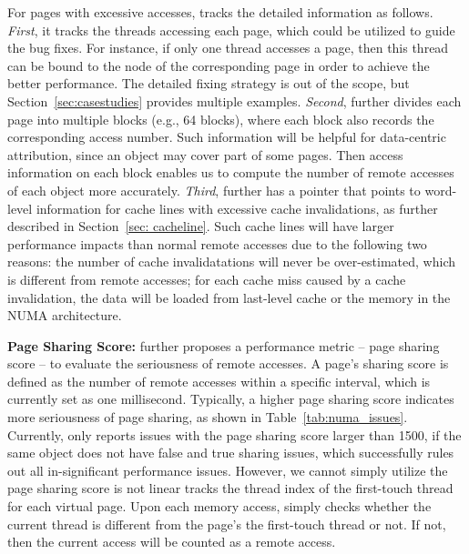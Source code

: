 For pages with excessive accesses, \NP{} tracks the detailed information as follows. \textit{First}, it tracks the threads accessing each page, which could be utilized to guide the bug fixes. For instance, if only one thread accesses a page, then this thread can be bound to the node of the corresponding page in order to achieve the better performance. The detailed fixing strategy is out of the scope, but Section~\ref{sec:casestudies} provides multiple examples. \textit{Second}, \NP{} further divides each page into multiple blocks (e.g., 64 blocks), where each block also records the corresponding access number. Such information will be helpful for data-centric attribution, since an object may cover part of some pages. Then access information on each block enables us to compute the number of remote accesses of each object more accurately. \textit{Third}, \NP{} further has a pointer that points to  word-level information for cache lines with excessive cache invalidations, as further described in Section~\ref{sec: cacheline}. Such cache lines will have larger performance impacts than normal remote accesses due to the following two reasons:  the number of cache invalidatations will never be over-estimated, which is different from remote accesses; for each cache miss caused by a cache invalidation, the data will be loaded from last-level cache or the memory in the NUMA architecture. 



\textbf{Page Sharing Score:} \NP{} further proposes a performance metric -- page sharing score -- to evaluate the seriousness of remote accesses. A page's sharing score is defined as the number of remote accesses within a specific interval, which is currently set as one millisecond. Typically, a higher page sharing score indicates more seriousness of page sharing, as shown in Table~\ref{tab:numa_issues}. Currently, \NP{} only reports issues with the page sharing score larger than 1500, if the same object does not have false and true sharing issues, which successfully rules out all in-significant performance issues. However, we cannot simply utilize the  page sharing score is not linear   
\NP{} tracks the thread index of the first-touch thread for each virtual page. Upon each memory access, \NP{} simply checks whether the current thread is different from the page's the first-touch thread or not. If not, then the current access will be counted as a remote access.  


